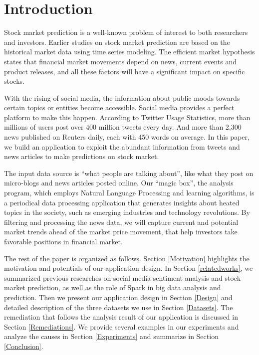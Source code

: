 \documentclass[conference]{IEEEtran}
\begin{document}
\section{Introduction}\label{Introduction}
Stock market prediction is a well-known problem of interest to both researchers and investors. Earlier studies on stock market prediction are based on the historical market data using time series modeling. The efficient market hypothesis states that financial market movements depend on news, current events and product releases, and all these factors will have a significant impact on specific stocks.

With the rising of social media, the information about public moods towards certain topics or entities become accessible. Social media provides a perfect platform to make this happen. According to Twitter Usage Statistics, more than millions of users post over 400 million tweets every day. And more than 2,300 news published on Reuters daily, each with 450 words on average. In this paper, we build an application to exploit the abundant information from tweets and news articles to make predictions on stock market.

The input data source is “what people are talking about”, like what they post on micro-blogs and news articles posted online. Our “magic box”, the analysis program, which employs Natural Language Processing and learning algorithms, is a periodical data processing application that generates insights about heated topics in the society, such as emerging industries and technology revolutions. By filtering and processing the news data, we will capture current and potential market trends ahead of the market price movement, that help investors take favorable positions in financial market.


The rest of the paper is organized as follows. Section \ref{Motivation} highlights the motivation and potentials of our application design. In Section \ref{relatedworks}, we summarized previous researches on social media sentiment analysis and stock market prediction, as well as the role of Spark in big data analysis and prediction. Then we present our application design in Section \ref{Design} and detailed description of the three datasets we use in Section \ref{Datasets}. The remediation that follows the analysis result of our application is discussed in Section \ref{Remediations}. We provide several examples in our experiments and analyze the causes in Section \ref{Experiments} and summarize in Section \ref{Conclusion}.
\vspace{1.0em}
\end{document}
